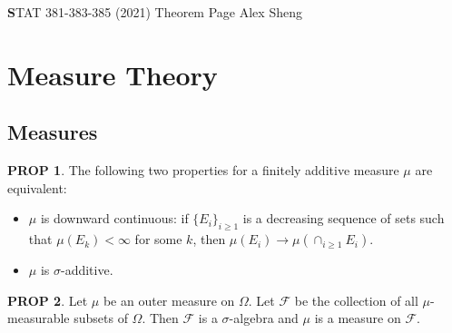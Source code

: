 \documentclass[hidelinks,11pt]{article}
\theoremstyle{definition}
\theoremstyle{dotless}
\newtheorem{prop}{PROP}[section]
\theoremstyle{remark}
\DeclareMathOperator{\1}{\mathbf{1}}
\begin{document}
\begin{center}
{\Large\textbf STAT 381-383-385 (2021)\hspace{0.1cm} Theorem Page}\medbreak
\large{Alex Sheng}
\end{center}

\vspace{0.2 cm}
\tableofcontents

\newpage
\section{Measure Theory}

\subsection{Measures}

\begin{prop}\label{Prop 1.1}
The following two properties for a finitely additive measure $\mu$ are equivalent:\begin{itemize}
    \item $\mu$ is downward continuous: if $\{E_i\}_{i\geq1}$ is a decreasing sequence of sets such that $\mu(E_k)<\infty$ for some $k$, then $\mu(E_i)\to\mu(\cap_{i\geq1}E_i).$
    \item $\mu$ is $\sigma$-additive.
\end{itemize}
\end{prop}

\begin{prop}\label{Prop 1.2}
Let $\mu$ be an outer measure on $\Omega$. Let $\mathcal{F}$ be the collection of all $\mu$-measurable subsets of $\Omega$. Then $\mathcal{F}$ is a $\sigma$-algebra and $\mu$ is a measure on $\mathcal{F}$.
\end{prop}
\end{document}
